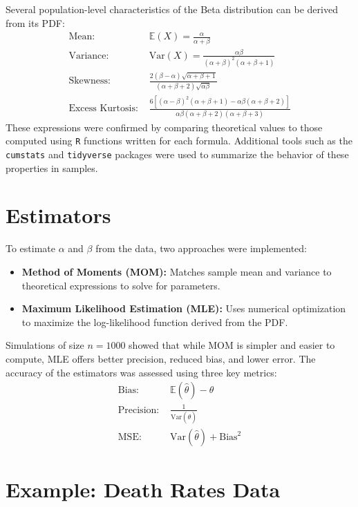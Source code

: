 \documentclass{article}\usepackage[]{graphicx}\usepackage[]{xcolor}
\begin{document}
\begin{multicols}{2}
Several population-level characteristics of the Beta distribution can be derived from its PDF:
\begin{align*}
\text{Mean: } & \mathbb{E}(X) = \frac{\alpha}{\alpha + \beta} \\
\text{Variance: } & \text{Var}(X) = \frac{\alpha \beta}{(\alpha + \beta)^2 (\alpha + \beta + 1)} \\
\text{Skewness: } & \frac{2(\beta - \alpha) \sqrt{\alpha + \beta + 1}}{(\alpha + \beta + 2) \sqrt{\alpha \beta}} \\
\text{Excess Kurtosis: } & \frac{6[(\alpha - \beta)^2 (\alpha + \beta + 1) - \alpha \beta (\alpha + \beta + 2)]}{\alpha \beta (\alpha + \beta + 2)(\alpha + \beta + 3)}
\end{align*}
These expressions were confirmed by comparing theoretical values to those computed using \texttt{R} functions written for each formula. Additional tools such as the \texttt{cumstats} and \texttt{tidyverse} packages were used to summarize the behavior of these properties in samples.

\section{Estimators}

To estimate $\alpha$ and $\beta$ from the data, two approaches were implemented: 
\begin{itemize}
\item \textbf{Method of Moments (MOM):} Matches sample mean and variance to theoretical expressions to solve for parameters.
\item \textbf{Maximum Likelihood Estimation (MLE):} Uses numerical optimization to maximize the log-likelihood function derived from the PDF.
\end{itemize}
Simulations of size $n = 1000$ showed that while MOM is simpler and easier to compute, MLE offers better precision, reduced bias, and lower error. The accuracy of the estimators was assessed using three key metrics:
\begin{align*}
\text{Bias: } & \mathbb{E}(\hat{\theta}) - \theta \\
\text{Precision: } & \frac{1}{\text{Var}(\hat{\theta})} \\
\text{MSE: } & \text{Var}(\hat{\theta}) + \text{Bias}^2
\end{align*}

\section{Example: Death Rates Data}


\end{multicols}
\end{document}
